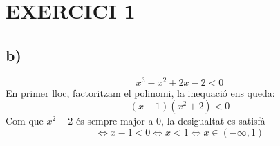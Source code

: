 \section*{EXERCICI 1}
\subsection*{b)}
\begin{equation*}
x^3 -x^2 +2x -2 < 0
\end{equation*}
En primer lloc, factoritzam el polinomi, la inequació ens queda:
$$(x-1)(x^2+2)<0$$
Com que $x^2+2$ és sempre major a 0, la desigualtat es satisfà $$\Leftrightarrow x-1<0\Leftrightarrow x<1 \Leftrightarrow \underline{x\in(-\infty,1)}$$